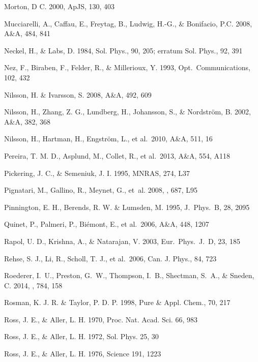\documentclass[traditabstract]{aa}
\begin{document}
\begin{thebibliography}{}
  Morton, D C. 2000, ApJS, 130, 403

  Mucciarelli, A., Caffau, E., Freytag, B., Ludwig, H.-G., \& Bonifacio, P.C. 2008, A\&A, 484, 841

  Neckel, H., \& Labs, D. 1984, Sol. Phys., 90, 205; erratum Sol. Phys., 92, 391

  Nez, F., Biraben, F., Felder, R., \& Millerioux, Y. 1993, Opt.\ Communications, 102, 432

  Nilsson, H. \& Ivarsson, S. 2008, A\&A, 492, 609

  Nilsson, H., Zhang, Z. G., Lundberg, H., Johansson, S., \& Nordstr\"om, B. 2002, A\&A, 382, 368

  Nilsson, H., Hartman, H., Engstr\"{o}m, L., et al.\ 2010, A\&A, 511, 16

  Pereira, T. M. D., Asplund, M., Collet, R., et al.\ 2013, A\&A, 554, A118

  Pickering, J. C., \& Semeniuk, J. I. 1995, MNRAS, 274, L37

  {Pignatari}, M., {Gallino}, R., {Meynet}, G., {et~al.} 2008, \apjl, 687, L95

  Pinnington, E. H., Berends, R. W. \& Lumsden, M. 1995, J.\ Phys.\ B, 28, 2095

  Quinet, P., Palmeri, P., Bi\'emont, E., et al.\ 2006, A\&A, 448, 1207

  Rapol, U. D., Krishna, A., \& Natarajan, V. 2003, Eur.\ Phys.\ J.\ D, 23, 185

  Rehse, S. J., Li, R., Scholl, T. J., et al.\ 2006, Can. J. Phys., 84, 723
 
  {Roederer}, I.~U., {Preston}, G.~W., {Thompson}, I.~B., {Shectman}, S.~A., \& {Sneden}, C. 2014, \apj, 784, 158

  Rosman, K. J. R. \& Taylor, P. D. P.  1998, Pure \& Appl. Chem., 70, 217
 
   Ross, J. E., \& Aller, L. H. 1970, Proc. Nat. Acad. Sci. 66, 983

  Ross, J. E., \& Aller, L. H. 1972, Sol. Phys. 25, 30

  Ross, J. E., \& Aller, L. H. 1976, Science 191, 1223


\end{thebibliography}
\end{document}
